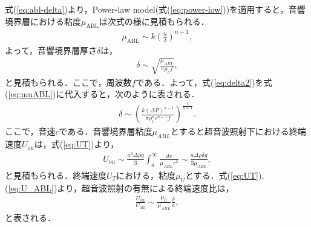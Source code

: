 式(\ref{eq:abl-delta})より，Power-law model(式(\ref{eq:power-low}))を適用すると，音響境界層における粘度$\mu_\text{ABL}$は次式の様に見積もられる．
\begin{eqnarray}
    \mu_\text{ABL} \sim k\left(\frac{u}{\delta}\right)^{n-1} ,
    \label{eq:muABL}
\end{eqnarray}
よって，音響境界層厚さ$\delta$は，
\begin{eqnarray}
    \delta \sim \sqrt{\frac{\mu_{ABL}}{\pi \rho_h f}} ,
    \label{eq:delta2}
\end{eqnarray}
と見積もられる\cite{deshpande2001vibrational,wiklund2012acoustofluidics}．ここで，周波数$f$である．よって，式(\ref{eq:delta2})を式(\ref{eq:muABL})に代入すると，次のように表される．
\begin{eqnarray}
    \delta \sim \left(\frac{k\left(\Delta P\right)^{n-1}}{\pi \rho^n_1 c^{n-1} f}\right)^{\frac{1}{n+1}} .
    \label{eq:delta}
\end{eqnarray}
ここで，音速$c$である．音響境界層粘度$\mu_{ABL}$とすると超音波照射下における終端速度$U_\text{on}$は，式(\ref{eq:UT})より，
\begin{eqnarray}
    U_\text{on} \sim \frac{a^3\Delta\rho g}{3}  \int^{\infty}_{a} \frac{dr}{\mu_{ABL} r^2} \sim \frac{a\Delta \rho \delta g}{3\mu_{ABL}} ,
    \label{eq:U_ABL}
\end{eqnarray}
と見積もられる．終端速度$U_T$における，粘度$\mu_U$とする．式(\ref{eq:UT}),(\ref{eq:U_ABL})より，超音波照射の有無による終端速度比は，
\begin{eqnarray}
    \frac{U_\text{on}}{U_\text{off}} \sim \frac{\mu_U}{\mu_{ABL}}\frac{\delta}{a} ,
    \label{eq:Udiff}
\end{eqnarray}
と表される．
